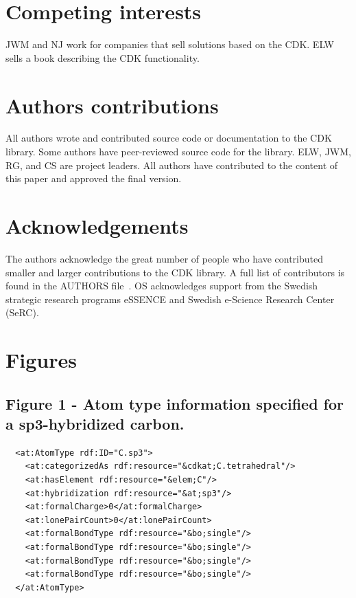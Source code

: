 \documentclass[10pt]{bmcart}
\begin{document}

\begin{backmatter}

\section*{Competing interests}
JWM and NJ work for companies that sell solutions based on the CDK. ELW sells
a book describing the CDK functionality.

\section*{Authors contributions}
All authors wrote and contributed source code or documentation to the CDK
library. Some authors have peer-reviewed source code for the library.
ELW, JWM, RG, and CS are project leaders. All authors have contributed to the
content of this paper and approved the final version.

\section*{Acknowledgements}
The authors acknowledge the great number of people who have contributed smaller
and larger contributions to the CDK library. A full list of contributors is
found in the AUTHORS file~\cite{AUTHORS}. OS acknowledges support from the Swedish strategic research programs eSSENCE and Swedish e-Science Research Center (SeRC).




\newpage

\section*{Figures}

\subsection*{Figure 1 - Atom type information specified for a sp3-hybridized
carbon.}\label{fig:atomtype}
\begin{verbatim}
  <at:AtomType rdf:ID="C.sp3">
    <at:categorizedAs rdf:resource="&cdkat;C.tetrahedral"/>
    <at:hasElement rdf:resource="&elem;C"/>
    <at:hybridization rdf:resource="&at;sp3"/>
    <at:formalCharge>0</at:formalCharge>
    <at:lonePairCount>0</at:lonePairCount>
    <at:formalBondType rdf:resource="&bo;single"/>
    <at:formalBondType rdf:resource="&bo;single"/>
    <at:formalBondType rdf:resource="&bo;single"/>
    <at:formalBondType rdf:resource="&bo;single"/>
  </at:AtomType>
\end{verbatim}


\end{backmatter}
\end{document}
